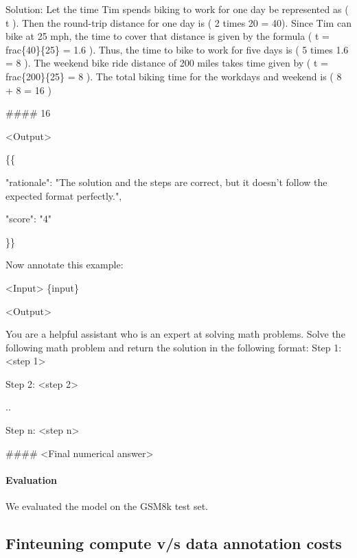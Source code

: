 \begin{tcolorbox}[breakable]
Solution: Let the time Tim spends biking to work for one day be represented as ( t ). Then the round-trip distance for one day is ( 2 times 20 = 40). Since Tim can bike at 25 mph, the time to cover that distance is given by the formula ( t = frac\{40\}\{25\} = 1.6 ). Thus, the time to bike to work for five days is ( 5 times 1.6 = 8 ). The weekend bike ride distance of 200 miles takes time given by ( t = frac\{200\}\{25\} = 8 ). The total biking time for the workdays and weekend is ( 8 + 8 = 16 )

\bigbreak

\#\#\#\# 16

\bigbreak

<Output>

\{\{

    "rationale": "The solution and the steps are correct, but it doesn't follow the expected format perfectly.",
    
    "score": "4"
    
\}\}

\bigbreak
Now annotate this example:

<Input>
\bigbreak
\{input\}

\bigbreak
<Output>



\end{tcolorbox}

\begin{tcolorbox}[breakable, title=System message]

You are a helpful assistant who is an expert at solving math problems. Solve the following math problem and return the solution in the following format:
\bigbreak
Step 1: <step 1> 

Step 2: <step 2> 

..

Step n: <step n> 
\bigbreak

\#\#\#\# <Final numerical answer>

    
\end{tcolorbox}

\paragraph{Evaluation} We evaluated the model on the GSM8k test set. 


\subsection{Finteuning compute v/s data annotation costs}

